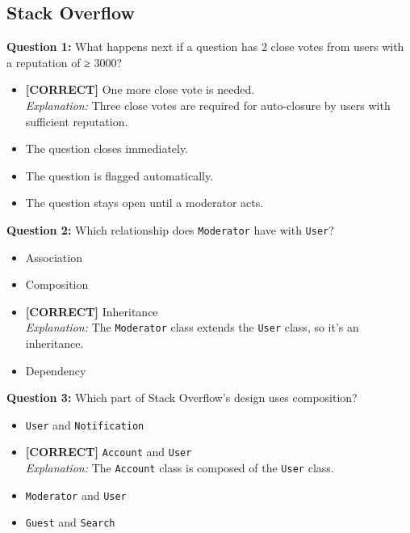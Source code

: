\subsection*{Stack Overflow}
\vspace{0.3cm}
\noindent
\textbf{Question 1:} What happens next if a question has 2 close votes from users with a reputation of ≥ 3000?
\\[0.2cm]
\begin{itemize}
 \item \textbf{[CORRECT]} One more close vote is needed.
\\[0.1cm]
\textit{Explanation:} 
Three close votes are required for auto-closure by users with sufficient reputation.
 \item The question closes immediately.
 \item The question is flagged automatically.
 \item The question stays open until a moderator acts.
\end{itemize}
\vspace{0.3cm}
\noindent
\textbf{Question 2:} Which relationship does \texttt{Moderator} have with \texttt{User}?
\\[0.2cm]
\begin{itemize}
 \item Association
 \item Composition
 \item \textbf{[CORRECT]} Inheritance
\\[0.1cm]
\textit{Explanation:} 
The \texttt{Moderator} class extends the \texttt{User} class, so it's an inheritance.
 \item Dependency
\end{itemize}
\vspace{0.3cm}
\noindent
\textbf{Question 3:} Which part of Stack Overflow's design uses composition?
\\[0.2cm]
\begin{itemize}
 \item \texttt{User} and \texttt{Notification}
 \item \textbf{[CORRECT]} \texttt{Account} and \texttt{User}
\\[0.1cm]
\textit{Explanation:} 
The \texttt{Account} class is composed of the \texttt{User} class.
 \item \texttt{Moderator} and \texttt{User}
 \item \texttt{Guest} and \texttt{Search}
\end{itemize}
\vspace{0.3cm}
